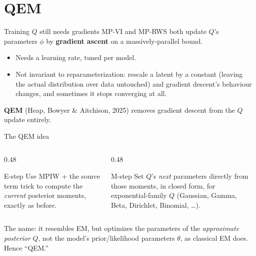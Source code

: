 \documentclass[aspectratio=169]{beamer}
\begin{document}
\section{QEM}

\begin{frame}{Training $Q$ still needs gradients}
  MP-VI and MP-RWS both update $Q$'s parameters $\phi$ by \textbf{gradient
  ascent} on a massively-parallel bound.
  \begin{itemize}
    \item Needs a learning rate, tuned per model.
    \item \alert{Not invariant to reparameterization}: rescale a latent by a
      constant (leaving the actual distribution over data untouched) and
      gradient descent's behaviour changes, and sometimes it stops converging
      at all.
  \end{itemize}
  \vfill
  \textbf{QEM} (Heap, Bowyer \& Aitchison, 2025) removes gradient descent
  from the $Q$ update entirely.
\end{frame}

\begin{frame}{The QEM idea}
  \begin{columns}[T]
    \begin{column}{0.48\textwidth}
      \begin{block}{E-step}
        Use MPIW + the source term trick to compute the \emph{current}
        posterior moments, exactly as before.
      \end{block}
    \end{column}
    \begin{column}{0.48\textwidth}
      \begin{block}{M-step}
        Set $Q$'s \emph{next} parameters directly from those moments, in
        closed form, for exponential-family $Q$ (Gaussian, Gamma, Beta,
        Dirichlet, Binomial, \dots).
      \end{block}
    \end{column}
  \end{columns}
  \vfill
  \small The name: it resembles EM, but optimizes the parameters of the
  \emph{approximate posterior} $Q$, not the model's prior/likelihood
  parameters $\theta$, as classical EM does. Hence ``QEM.''
\end{frame}
\end{document}

